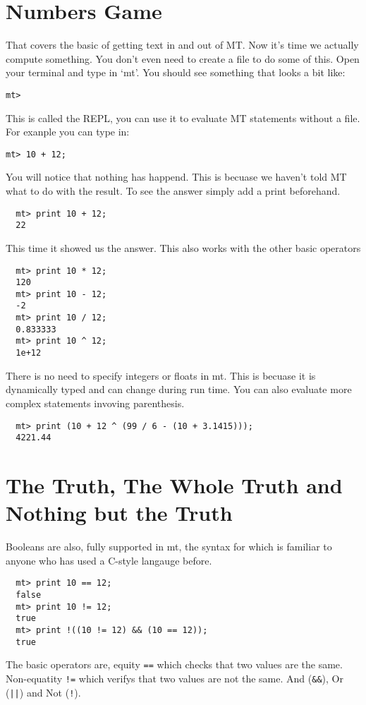 \documentclass{report}
\begin{document}
\section{Numbers Game}
That covers the basic of getting text in and out of MT. Now it's time we actually compute something. You don't even need to create a file to do some of this. Open your terminal and type in `mt'. You should see something that looks a bit like:
\begin{lstlisting}
mt>
\end{lstlisting}
This is called the REPL, you can use it to evaluate MT statements without a file. For exanple you can type in:
\begin{lstlisting}
mt> 10 + 12;
\end{lstlisting}
You will notice that nothing has happend. This is becuase we haven't told MT what to do with the result. To see the answer simply add a print beforehand.
\begin{lstlisting}
  mt> print 10 + 12;
  22
\end{lstlisting}
This time it showed us the answer. This also works with the other basic operators
\begin{lstlisting}
  mt> print 10 * 12;
  120
  mt> print 10 - 12;
  -2
  mt> print 10 / 12;
  0.833333
  mt> print 10 ^ 12;
  1e+12
\end{lstlisting}
There is no need to specify integers or floats in mt. This is becuase it is dynamically typed and can change during run time. You can also evaluate more complex statements invoving parenthesis.
\begin{lstlisting}
  mt> print (10 + 12 ^ (99 / 6 - (10 + 3.1415)));
  4221.44
\end{lstlisting}

\section{The Truth, The Whole Truth and Nothing but the Truth}
Booleans are also, fully supported in mt, the syntax for which is familiar to anyone who has used a C-style langauge before.

\begin{lstlisting}
  mt> print 10 == 12;
  false
  mt> print 10 != 12;
  true
  mt> print !((10 != 12) && (10 == 12));
  true
\end{lstlisting}

The basic operators are, equity \texttt{==} which checks that two values are the same.
Non-equatity \texttt{!=} which verifys that two values are not the same.
And (\texttt{\&\&}), Or (\texttt{||}) and Not (\texttt{!}).
\end{document}
